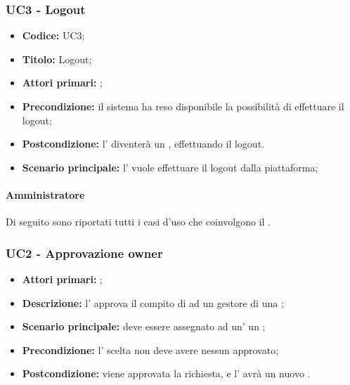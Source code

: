 \documentclass[casi-duso]{subfiles}
\begin{document}
\subsubsection{UC3 - Logout}
\label{subsub:UC3}

\begin{itemize}
  \item \textbf{Codice:} UC3;
  \item \textbf{Titolo:} Logout;
  \item \textbf{Attori primari:} ;
  \item \textbf{Precondizione:} il sistema ha reso disponibile la possibilità di effettuare il logout;
  \item \textbf{Postcondizione:} l' diventerà un , effettuando il logout.
  \item \textbf{Scenario principale:} l' vuole effettuare il logout dalla piattaforma;
\end{itemize}



\paragraph{Amministratore}
\label{par:amministratore}
Di seguito sono riportati tutti i casi d'uso che coinvolgono il  .


\subsubsection{UC2 - Approvazione owner}
\label{subsub:UC2}

\begin{itemize}
  \item \textbf{Attori primari:} ;
  \item \textbf{Descrizione:} l' approva il compito di  ad un gestore di una ;
  \item \textbf{Scenario principale:} deve essere assegnato ad un' un ;
  \item \textbf{Precondizione:} l' scelta non deve avere nessun  approvato;
  \item \textbf{Postcondizione:} viene approvata la richiesta, e l' avrà un nuovo .

\end{itemize}
\end{document}
